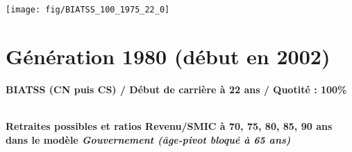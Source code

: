  \vspace{0.1cm} 

 {\hspace{-2.2cm}\texttt{[image: fig/BIATSS\_100\_1975\_22\_0]}} 

\newpage 
 
\section{Génération 1980 (début en 2002)\label{BIATSS_100_1980_22_0}} 
 
{\bf \noindent BIATSS (CN puis CS) / Début de carrière à 22 ans / Quotité : 100\%}  ~ 

 ~\\{\bf \noindent Retraites possibles et ratios Revenu/SMIC à 70, 75, 80, 85, 90 ans dans le modèle \emph{Gouvernement (âge-pivot bloqué à 65 ans)}}  
 
